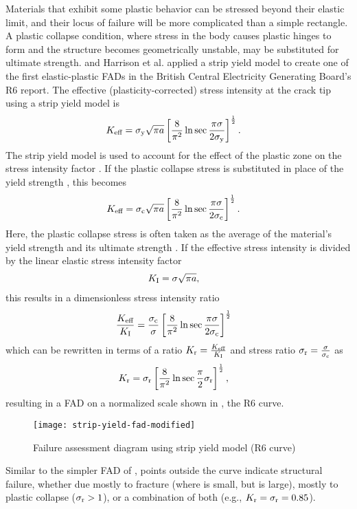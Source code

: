 Materials that exhibit some plastic behavior can be stressed beyond their elastic limit, and their locus of failure will be more complicated than a simple rectangle.
A plastic collapse condition, where stress in the body causes plastic hinges to form and the structure becomes geometrically unstable, may be substituted for ultimate strength.
\citet{dowling1975} and Harrison et al. \cite{r6-1976} applied a strip yield model to create one of the first elastic-plastic FADs in the British Central Electricity Generating Board's R6 report.
The effective (plasticity-corrected) stress intensity at the crack tip using a strip yield model is
\begin{align}
K_\textnormal{eff} &= \sigma_{\textnormal{y}} \sqrt{\pi a} \left[ \frac{8}{\pi^2} \ln \sec \frac{\pi \sigma}{2 \sigma_{\textnormal{y}}} \right]^{\frac{1}{2}}.
\end{align}
The strip yield model is used to account for the effect of the plastic zone on the stress intensity factor \KI.
If the plastic collapse stress \Sc is substituted in place of the yield strength \Sy, this becomes
\begin{align}
K_\textnormal{eff} &= \sigma_{\textnormal{c}} \sqrt{\pi a} \left[ \frac{8}{\pi^2} \ln \sec \frac{\pi \sigma}{2 \sigma_{\textnormal{c}}} \right]^{\frac{1}{2}}.
\end{align}
Here, the plastic collapse stress is often taken as the average of the material's yield strength \Sy and its ultimate strength \Sut.
If the effective stress intensity is divided by the linear elastic stress intensity factor
\begin{align}
K_\textnormal{I} &= \sigma \sqrt{\pi a},
\end{align}
this results in a dimensionless stress intensity ratio
\begin{align}
\frac{K_\textnormal{eff}}{K_\textnormal{I}} &= \frac{\sigma_{\textnormal{c}}}{\sigma} \left[ \frac{8}{\pi^2} \ln \sec \frac{\pi \sigma}{2 \sigma_{\textnormal{c}}} \right]^{\frac{1}{2}}
\end{align}
which can be rewritten in terms of a \K ratio \(K_\textnormal{r}=\frac{K_\textnormal{eff}}{K_\textnormal{I}}\) and stress ratio \(\sigma_{\textnormal{r}} = \frac{\sigma}{\sigma_{\textnormal{c}}} \) as
\begin{align}
K_\textnormal{r} &= \sigma_{\textnormal{r}}  \left[ \frac{8}{\pi^2} \ln \sec \frac{\pi}{2} \sigma_{\textnormal{r}} \right]^{\frac{1}{2}},
\end{align}
resulting in a FAD on a normalized scale shown in , the R6 curve.
\begin{figure}
\centering
\texttt{[image: strip-yield-fad-modified]}
\caption{\label{fig:strip-yield-fad} Failure assessment diagram using strip yield model (R6 curve)}
\end{figure}
Similar to the simpler FAD of , points outside the curve indicate structural failure, whether due mostly to fracture (where \Sr is small, but \Kr is large), mostly to plastic collapse (\(\sigma_{\textnormal{r}} > 1\)), or a combination of both (e.g., \(K_\textnormal{r} = \sigma_{\textnormal{r}} = 0.85\)).

